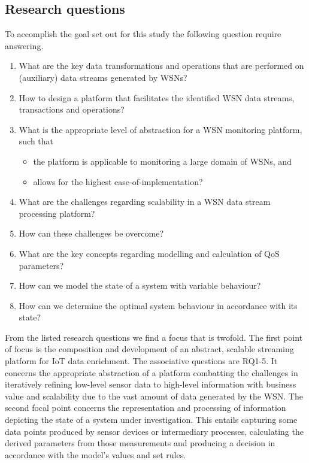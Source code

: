 \subsection{Research questions}
To accomplish the goal set out for this study the following question require answering.
\begin{enumerate}[leftmargin=24pt, label=\small RQ\arabic*]
\nospace
\item\label{rq:identify_processes} What are the key data transformations and operations that are performed on (auxiliary) data streams generated by WSNs?
\item\label{rq:desing_processes} How to design a platform that facilitates the identified WSN data streams, transactions and operations?
\item\label{rq:abstraction} What is the appropriate level of abstraction for a WSN monitoring platform, such that
\begin{itemize}
\nospace
\item the platform is applicable to monitoring a large domain of WSNs, and
\item allows for the highest ease-of-implementation?
\end{itemize}
\item\label{rq:identify_scale} What are the challenges regarding scalability in a WSN data stream processing platform?
\item\label{rq:design_scale} How can these challenges be overcome?
\item\label{rq:idenfity_model} What are the key concepts regarding modelling and calculation of QoS parameters?
\item\label{rq:design_model} How can we model the state of a system with variable behaviour?
\item\label{rq:solve_model} How can we determine the optimal system behaviour in accordance with its state?
\end{enumerate}

From the listed research questions we find a focus that is twofold. The first point of focus is the composition and development of an abstract, scalable streaming platform for IoT data enrichment. The associative questions are RQ1-5. It concerns the appropriate abstraction of a platform combatting the challenges in iteratively refining low-level sensor data to high-level information with business value and scalability due to the vast amount of data generated by the WSN.  The second focal point concerns the representation and processing of information depicting the state of a system under investigation. This entails capturing some data points produced by sensor devices or intermediary processes, calculating the derived parameters from those measurements and producing a decision in accordance with the model's values and set rules.

